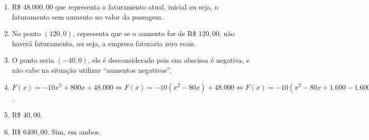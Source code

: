 \documentclass[10 pt,usenames,dvipsnames, oneside]{article}
\begin{document}
\begin{solucao}
\begin{enumerate}
\item {} 
R\$ \(48.000{,}00\) que representa o faturamento atual, inicial ou seja, o faturamento sem aumento no valor da passagem.

\item {} 
No ponto \((120,0)\), representa que se o aumento for de R\$ \(120,00\), não haverá faturamento, ou seja, a empresa faturaria zero reais.

\item {} 
O ponto seria \((-40,0)\), ele é desconsiderado pois sua abscissa é negativa, e não cabe na situação utilizar “aumentos negativos”.

\item {} 
\(F(x)=-10x^2+800x+48.000\iff F(x)=-10(x^2-80x)+48.000\iff F(x)=-10(x^2-80x+1.600-1.600)+48.000\iff F(x)=-10(x-40)^2+16.000+48.000
\iff F(x)=-10(x-40)^2+64.000\).

\item {} 
R\$ \(40{,}00\).

\item {} 
R\$ \(6400{,}00\). Sim, em ambos.

\end{enumerate}

\end{solucao}
\fi
\end{document}
